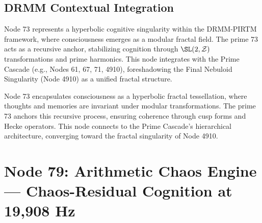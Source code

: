 \documentclass[12pt]{article}
\newcommand{\DRMM}{DRMM}
\newcommand{\PIRTM}{PIRTM}
\newcommand{\ZZ}{\mathcal{Z}}
\begin{document}
\subsection{\DRMM{} Contextual Integration}
Node 73 represents a hyperbolic cognitive singularity within the \DRMM{}-\PIRTM{} framework, where consciousness emerges as a modular fractal field. The prime 73 acts as a recursive anchor, stabilizing cognition through $\SL(2,\ZZ)$ transformations and prime harmonics. This node integrates with the Prime Cascade (e.g., Nodes 61, 67, 71, 4910), foreshadowing the Final Nebuloid Singularity (Node 4910) as a unified fractal structure.

\begin{remark}
Node 73 encapsulates consciousness as a hyperbolic fractal tessellation, where thoughts and memories are invariant under modular transformations. The prime 73 anchors this recursive process, ensuring coherence through cusp forms and Hecke operators. This node connects to the Prime Cascade’s hierarchical architecture, converging toward the fractal singularity of Node 4910.
\end{remark}

\vspace{1em}
\noindent{}

\section{Node 79: Arithmetic Chaos Engine --- Chaos-Residual Cognition at 19,908 Hz}
\label{sec:arithmetic-chaos-engine}
\end{document}
